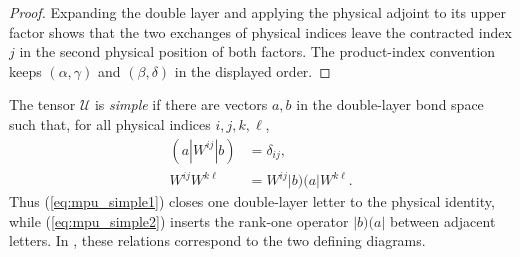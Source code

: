 \begin{proof}\leanok
    Expanding the double layer and applying the physical adjoint to its upper
    factor shows that the two exchanges of physical indices leave the contracted index
    $j$ in the second physical position of both factors. The product-index
    convention keeps $(\alpha,\gamma)$ and $(\beta,\delta)$ in the displayed
    order.
\end{proof}

\begin{definition}
    \label{def:mpu_simple}
    \leanok
    The tensor $\mathcal U$ is \emph{simple} if there are vectors $a,b$ in
    the double-layer bond space such that, for all physical indices
    $i,j,k,\ell$,
    \begin{align}
        (a|W^{ij}|b) & =\delta_{ij},
        \tag{simple1}\label{eq:mpu_simple1}    \\
        W^{ij}W^{k\ell}
                     & =W^{ij}|b)(a|W^{k\ell}.
        \tag{simple2}\label{eq:mpu_simple2}
    \end{align}
    Thus (\ref{eq:mpu_simple1}) closes one double-layer letter to the
    physical identity, while (\ref{eq:mpu_simple2}) inserts the rank-one
    operator $|b)(a|$ between adjacent letters.  In \cite[Definition~III.2]{Cirac2017MPU}, these relations correspond to the two
    defining diagrams.
\end{definition}

